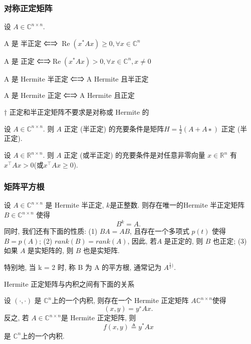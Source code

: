 \documentclass[12pt,a4paper]{article}
\begin{document}
\subsubsection{对称正定矩阵}
设 $A ∈ \mathbb{C}^{n×n}$.

A 是 半正定 ⇐⇒ $\operatorname{Re}\left(x^{*} A x\right) \geq 0, \forall x \in \mathbb{C}^{n}$

A 是 正定 ⇐⇒$\operatorname{Re}\left(x^{*} A x\right)>0, \forall x \in \mathbb{C}^{n}, x \neq 0$

A 是 Hermite 半正定 ⇐⇒ A Hermite 且半正定

A 是 Hermite 正定 ⇐⇒ A Hermite 且正定


† 正定和半正定矩阵不要求是对称或 Hermite 的



\begin{theorem}
	设 $A ∈ \mathbb{C}^{n×n}$. 则 $A$ 正定 (半正定) 的充要条件是矩阵$ H =\frac{1}{2}(A +A∗)$ 正定 (半正定). 
\end{theorem}



\begin{theorem}
	设 $A ∈ \mathbb{R}^{n×n}$. 则 $A$ 正定 (或半正定) 的充要条件是对任意非零向量 $x ∈ \mathbb{R}^n$ 有 $x^{⊺}Ax > 0 $(或$ x^{⊺}Ax ≥ 0$). 
\end{theorem}



\subsubsection{矩阵平方根}

\begin{theorem}
	设 $A ∈ \mathbb{C}^{n×n}$ 是 Hermite 半正定, $k $是正整数. 则存在唯一的Hermite 半正定矩阵 $B ∈ \mathbb{C}^{n×n}$ 使得
	$$B^k = A.$$
	同时, 我们还有下面的性质:
	(1) $BA = AB$, 且存在一个多项式 $p(t)$ 使得$ B = p(A)$;
	(2) $rank(B) = rank(A)$, 因此, 若$ A$ 是正定的, 则 $B$ 也正定;
	(3) 如果 $A$ 是实矩阵的, 则 $B$ 也是实矩阵.
\end{theorem}


特别地, 当 k = 2 时, 称 B 为 A 的平方根, 通常记为 $A^{\frac{1}{2})}$.

Hermite 正定矩阵与内积之间有下面的关系

\begin{theorem}
	设 $(·, ·)$ 是 $\mathbb{C}^n$上的一个内积, 则存在一个 Hermite 正定矩阵 $A  \mathbb{C}^{n×n}$使得
	$$(x, y) = y^∗Ax.$$
	反之, 若 $A ∈  \mathbb{C}^{n×n} $是 Hermite 正定矩阵, 则
	$$
	f(x, y) \triangleq y^{*} A x
	$$
	是 $\mathbb{C}^n $上的一个内积. 
\end{theorem}
\end{document}

